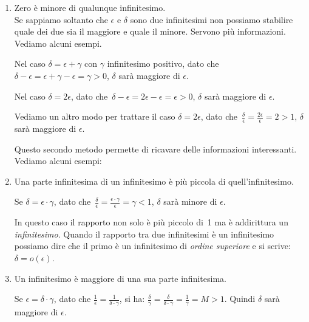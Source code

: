 \begin{enumerate}
 \item Zero è minore di qualunque infinitesimo.\\
  Se sappiamo soltanto che $\epsilon$ e $\delta$ sono due infinitesimi 
  non possiamo stabilire quale dei due sia il maggiore e quale il minore. 
  Servono più informazioni. Vediamo alcuni esempi.

  \begin{esempio}
   Nel caso $\delta = \epsilon + \gamma$ con $\gamma$ infinitesimo positivo, 
   dato che~$\delta-\epsilon=\epsilon+\gamma-\epsilon=\gamma>0$, 
   $\delta$ sarà maggiore di $\epsilon$.
  \end{esempio}

  \begin{esempio}
   Nel caso $\delta = 2\epsilon$, 
   dato che~$\delta-\epsilon=2\epsilon-\epsilon=\epsilon>0$, 
   $\delta$ sarà maggiore di $\epsilon$.
  \end{esempio}

  \begin{esempio}
   Vediamo un altro modo per trattare il caso $\delta = 2\epsilon$, 
   dato che~$\frac{\delta}{\epsilon}=\frac{2\epsilon}{\epsilon}=2>1$, 
   $\delta$ sarà maggiore di $\epsilon$.
  \end{esempio}

  Questo secondo metodo permette di ricavare delle informazioni interessanti. 
  Vediamo alcuni esempi:

 \item Una parte infinitesima di un infinitesimo è più piccola di quell'infinitesimo.
  \begin{esempio}
   Se $\delta = \epsilon \cdot \gamma$, dato 
   che~$\frac{\delta}{\epsilon}=\frac{\epsilon \cdot \gamma}{\epsilon}=\gamma<1$, 
   $\delta$ sarà minore di $\epsilon$.
  \end{esempio}

  \begin{osservazione}
   In questo caso il rapporto non solo è più piccolo di~1 ma è addirittura un 
   \emph{infinitesimo}. 
   Quando il rapporto tra due infinitesimi è un infinitesimo 
   possiamo dire che il primo è un infinitesimo di \emph{ordine superiore} e si 
   scrive:~$\delta=o(\epsilon)$.
  \end{osservazione}

 \item Un infinitesimo è maggiore di una sua parte infinitesima.

  \begin{esempio}
   Se $\epsilon=\delta\cdot\gamma$, dato che 
   $\frac{1}{\epsilon}=\frac{1}{\delta\cdot \gamma}$, si ha:
   $\frac{\delta}{\gamma}=\frac{\delta}{\delta\cdot \gamma}=
   \frac{1}{\gamma}=M>1$. Quindi $\delta $ sarà maggiore di $\epsilon$.
  \end{esempio}


\end{enumerate}
